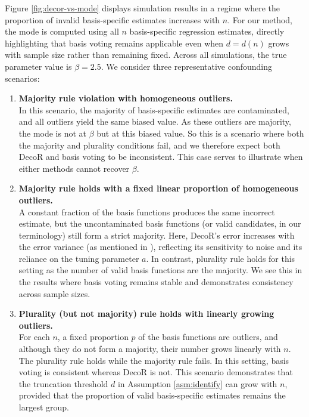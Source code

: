 \documentclass[
  12pt]{article}
\begin{document}
Figure \ref{fig:decor-vs-mode} displays simulation results in a regime where the proportion of invalid basis-specific estimates increases with $n$. For our method, the mode is computed using all $n$ basis-specific regression estimates, directly highlighting that basis voting remains applicable even when $d = d(n)$ grows with sample size rather than remaining fixed. %
Across all simulations, the true parameter value is $\beta = 2.5$. We consider three representative confounding scenarios:

\begin{enumerate}
    \item[(a)] \textbf{Majority rule violation with homogeneous outliers.} \\
    In this scenario, the majority of basis-specific estimates are contaminated, and all outliers yield the same biased value. 
    As these outliers are majority, the mode is not at $\beta$ but at this biased value. So this is a scenario where both the majority and plurality conditions fail, and we therefore expect both DecoR and basis voting to be inconsistent. This case serves to %
    illustrate%
    when either methods cannot recover $\beta$.

    \item[(b)] \textbf{Majority rule holds with a fixed linear proportion of homogeneous outliers.} \\
    A constant fraction of the basis functions produces the same incorrect estimate, but the uncontaminated basis functions (or valid candidates, in our terminology) still form a strict majority. Here, DecoR’s error increases with the error variance (as mentioned in \cite{schur2025decor}), reflecting its sensitivity to noise and its reliance on the tuning parameter $a$. In contrast, plurality rule holds for this setting as the number of valid basis functions are the majority. We see this in the results where basis voting remains stable and demonstrates consistency across sample sizes.

    \item[(c)] \textbf{Plurality (but not majority) rule holds with linearly growing outliers.} \\
    For each $n$, a fixed proportion $p$ of the basis functions are outliers, and although they do not form a majority, their number grows linearly with $n$. The plurality rule holds while the majority rule fails. In this setting, basis voting is consistent whereas DecoR is not. This scenario demonstrates that the truncation threshold $d$ in Assumption \ref{asm:identify} can grow with $n$, provided that the proportion of valid basis-specific estimates remains the largest group.
\end{enumerate}
\end{document}
